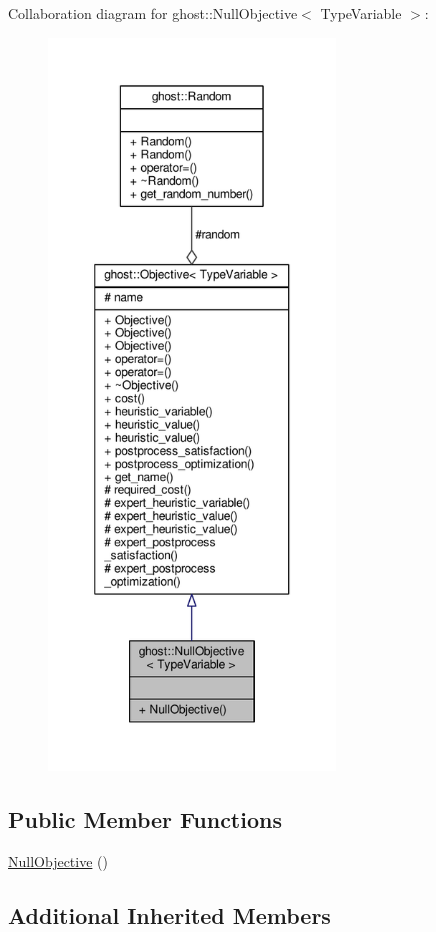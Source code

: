 Collaboration diagram for ghost\-:\-:Null\-Objective$<$ Type\-Variable $>$\-:\nopagebreak
\begin{figure}[H]
\begin{center}
\leavevmode
\includegraphics[height=550pt]{classghost_1_1NullObjective__coll__graph}
\end{center}
\end{figure}
\subsection*{Public Member Functions}
\begin{DoxyCompactItemize}
\item 
\hyperlink{classghost_1_1NullObjective_a5c57ea84bfe1080ea756492dab255c12}{Null\-Objective} ()
\end{DoxyCompactItemize}
\subsection*{Additional Inherited Members}



